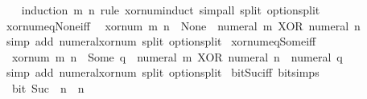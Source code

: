 \begin{isabellebody}
%
\isadelimproof
\ \ %
\endisadelimproof
%
\isatagproof
{}\isamarkupfalse%
\ {\isacharparenleft}{\kern0pt}induction\ m\ n\ rule{\isacharcolon}{\kern0pt}\ xor{\isacharunderscore}{\kern0pt}num{\isachardot}{\kern0pt}induct{\isacharparenright}{\kern0pt}\ {\isacharparenleft}{\kern0pt}simp{\isacharunderscore}{\kern0pt}all\ split{\isacharcolon}{\kern0pt}\ option{\isachardot}{\kern0pt}split{\isacharparenright}{\kern0pt}%
\endisatagproof
{\isafoldproof}%
%
\isadelimproof
\isanewline
%
\endisadelimproof
\isanewline
{}\isamarkupfalse%
\ xor{\isacharunderscore}{\kern0pt}num{\isacharunderscore}{\kern0pt}eq{\isacharunderscore}{\kern0pt}None{\isacharunderscore}{\kern0pt}iff{\isacharcolon}{\kern0pt}\isanewline
\ \ {\isacartoucheopen}xor{\isacharunderscore}{\kern0pt}num\ m\ n\ {\isacharequal}{\kern0pt}\ None\ {\isasymlongleftrightarrow}\ numeral\ m\ XOR\ numeral\ n\ {\isacharequal}{\kern0pt}\ {}{\isacartoucheclose}\isanewline
%
\isadelimproof
\ \ %
\endisadelimproof
%
\isatagproof
{}\isamarkupfalse%
\ {\isacharparenleft}{\kern0pt}simp\ add{\isacharcolon}{\kern0pt}\ numeral{\isacharunderscore}{\kern0pt}xor{\isacharunderscore}{\kern0pt}num\ split{\isacharcolon}{\kern0pt}\ option{\isachardot}{\kern0pt}split{\isacharparenright}{\kern0pt}%
\endisatagproof
{\isafoldproof}%
%
\isadelimproof
\isanewline
%
\endisadelimproof
\isanewline
{}\isamarkupfalse%
\ xor{\isacharunderscore}{\kern0pt}num{\isacharunderscore}{\kern0pt}eq{\isacharunderscore}{\kern0pt}Some{\isacharunderscore}{\kern0pt}iff{\isacharcolon}{\kern0pt}\isanewline
\ \ {\isacartoucheopen}xor{\isacharunderscore}{\kern0pt}num\ m\ n\ {\isacharequal}{\kern0pt}\ Some\ q\ {\isasymlongleftrightarrow}\ numeral\ m\ XOR\ numeral\ n\ {\isacharequal}{\kern0pt}\ numeral\ q{\isacartoucheclose}\isanewline
%
\isadelimproof
\ \ %
\endisadelimproof
%
\isatagproof
{}\isamarkupfalse%
\ {\isacharparenleft}{\kern0pt}simp\ add{\isacharcolon}{\kern0pt}\ numeral{\isacharunderscore}{\kern0pt}xor{\isacharunderscore}{\kern0pt}num\ split{\isacharcolon}{\kern0pt}\ option{\isachardot}{\kern0pt}split{\isacharparenright}{\kern0pt}%
\endisatagproof
{\isafoldproof}%
%
\isadelimproof
\isanewline
%
\endisadelimproof
\isanewline
{}\isamarkupfalse%
\isanewline
\isanewline
{}\isamarkupfalse%
\ bit{\isacharunderscore}{\kern0pt}Suc{\isacharunderscore}{\kern0pt}{}{\isacharunderscore}{\kern0pt}iff\ {\isacharbrackleft}{\kern0pt}bit{\isacharunderscore}{\kern0pt}simps{\isacharbrackright}{\kern0pt}{\isacharcolon}{\kern0pt}\isanewline
\ \ {\isacartoucheopen}bit\ {\isacharparenleft}{\kern0pt}Suc\ {}{\isacharparenright}{\kern0pt}\ n\ {\isasymlongleftrightarrow}\ n\ {\isacharequal}{\kern0pt}\ {}{\isacartoucheclose}\isanewline

\end{isabellebody}

